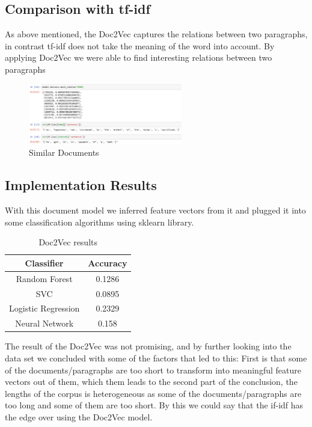 \documentclass[journal,12pt,onecolumn]{IEEEtran}
\begin{document}
\subsection{Comparison with tf-idf}
As above mentioned, the Doc2Vec captures the relations between two paragraphs, in contrast tf-idf does not take the meaning of the word into account. By applying Doc2Vec we were able to find interesting relations between two paragraphs
\begin{figure}[h]
    \centering
    \includegraphics[width=0.6\textwidth]{doc2vec.png}
    \caption{Similar Documents}
    \label{fig:doc2vec}
\end{figure}


\subsection{Implementation Results}
With this document model we inferred feature vectors from it and plugged it into some classification algorithms using sklearn library.
\begin{table}
\centering
\caption{Doc2Vec results}
\label{Doc2Vec results}
\begin{tabular}{@{}cc@{}}
\toprule
Classifier          & Accuracy \\ \midrule
Random Forest       & 0.1286   \\
SVC                 & 0.0895   \\
Logistic Regression & 0.2329   \\
Neural Network      & 0.158    \\ \bottomrule
\end{tabular}
\end{table}
The result of the Doc2Vec was not promising, and by further looking into the data set we concluded with some of the factors that led to this: First is that some of the documents/paragraphs are too short to transform into meaningful feature vectors out of them, which them leads to the second part of the conclusion, the lengths of the corpus is heterogeneous as some of the documents/paragraphs are too long and some of them are too short. By this we could say that the if-idf has the edge over using the Doc2Vec model.
\end{document}
